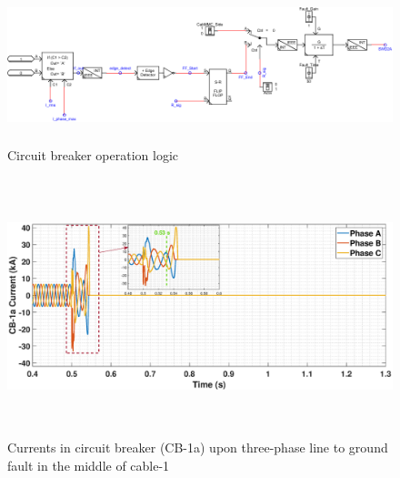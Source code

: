 \begin{figure}[H]
\centering
    \includegraphics[height = 4.5cm,width = \textwidth]{Diagrams/Chapter_5/Fault_logic_New.pdf}
    \caption{Circuit breaker operation logic}
    \label{fig:Fault_logic}
\end{figure}

\begin{figure}[H]
    \includegraphics[height = 7.5cm,width = \textwidth]{Diagrams/Chapter_5/IABC_CB_3phaseSC_new_5.eps}
    \caption{Currents in circuit breaker (CB-1a) upon three-phase line to ground fault in the middle of cable-1}
    \label{Circuit_breaker_3phasefault}
\end{figure}

